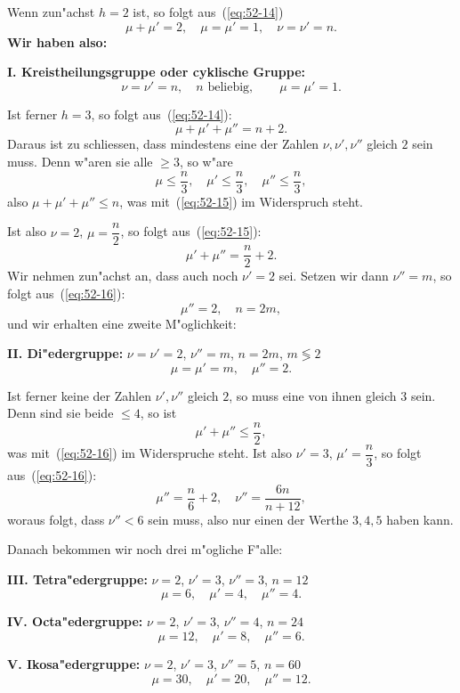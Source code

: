 \documentclass[12pt,a4paper]{article}
\theoremstyle{definition}
\begin{document}
Wenn zun"achst $h = 2$ ist, so folgt aus~(\ref{eq:52-14})
\[
\mu + \mu' = 2, \quad \mu = \mu' = 1, \quad \nu = \nu' = n.
\]
\textbf{Wir haben also:}

\textbf{I. Kreistheilungsgruppe oder cyklische Gruppe:}
\[
\nu = \nu' = n, \quad n \text{ beliebig}, \qquad \mu = \mu' = 1.
\]

Ist ferner $h = 3$, so folgt aus~(\ref{eq:52-14}):
\begin{equation}\label{eq:52-15}
\mu + \mu' + \mu'' = n + 2.
\end{equation}
Daraus ist zu schliessen, dass mindestens eine der Zahlen $\nu, \nu', \nu''$ gleich $2$ sein muss. Denn w"aren sie alle $\geq 3$, so w"are
\[
\mu \leq \frac{n}{3}, \quad \mu' \leq \frac{n}{3}, \quad \mu'' \leq \frac{n}{3},
\]
also $\mu + \mu' + \mu'' \leq n$, was mit~(\ref{eq:52-15}) im Widerspruch steht.

Ist also $\nu = 2$, $\mu = \dfrac{n}{2}$, so folgt aus~(\ref{eq:52-15}):
\begin{equation}\label{eq:52-16}
\mu' + \mu'' = \frac{n}{2} + 2.
\end{equation}
Wir nehmen zun"achst an, dass auch noch $\nu' = 2$ sei. Setzen wir dann $\nu'' = m$, so folgt aus~(\ref{eq:52-16}):
\[
\mu'' = 2, \quad n = 2m,
\]
und wir erhalten eine zweite M"oglichkeit:

\textbf{II. Di"edergruppe:} $\nu = \nu' = 2$, $\nu'' = m$, $n = 2m$, $m \lessgtr 2$
\[
\mu = \mu' = m, \quad \mu'' = 2.
\]

Ist ferner keine der Zahlen $\nu', \nu''$ gleich $2$, so muss eine von ihnen gleich $3$ sein. Denn sind sie beide $\leq 4$, so ist
\[
\mu' + \mu'' \leq \frac{n}{2},
\]
was mit~(\ref{eq:52-16}) im Widerspruche steht. Ist also $\nu' = 3$, $\mu' = \dfrac{n}{3}$, so folgt aus~(\ref{eq:52-16}):
\begin{equation}\label{eq:52-17}
\mu'' = \frac{n}{6} + 2, \quad \nu'' = \frac{6n}{n + 12},
\end{equation}
woraus folgt, dass $\nu'' < 6$ sein muss, also nur einen der Werthe $3, 4, 5$ haben kann.

Danach bekommen wir noch drei m"ogliche F"alle:

\textbf{III. Tetra"edergruppe:} $\nu = 2$, $\nu' = 3$, $\nu'' = 3$, $n = 12$
\[
\mu = 6, \quad \mu' = 4, \quad \mu'' = 4.
\]

\textbf{IV. Octa"edergruppe:} $\nu = 2$, $\nu' = 3$, $\nu'' = 4$, $n = 24$
\[
\mu = 12, \quad \mu' = 8, \quad \mu'' = 6.
\]

\textbf{V. Ikosa"edergruppe:} $\nu = 2$, $\nu' = 3$, $\nu'' = 5$, $n = 60$
\[
\mu = 30, \quad \mu' = 20, \quad \mu'' = 12.
\]
\end{document}
